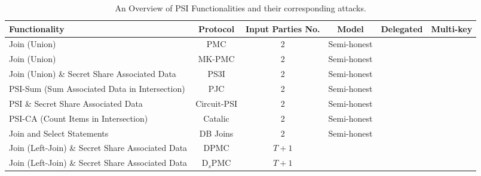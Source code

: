 \begin{table*}[h!]
\centering
\renewcommand{\arraystretch}{1.1}
\begin{tabular}{l c c c c c}
\toprule
\textbf{Functionality} & \textbf{Protocol} & \textbf{Input Parties No.} & \textbf{Model}  & \textbf{Delegated} & \textbf{Multi-key} \\
\midrule
Join (Union) & PMC & 2 & Semi-honest &   &   \\
Join (Union) & MK-PMC & 2 & Semi-honest &   &    \\
Join (Union) \& Secret Share Associated Data & PS3I & 2 & Semi-honest &   &   \\
PSI-Sum (Sum Associated Data in Intersection) & PJC & 2 & Semi-honest  &  &    \\
PSI \& Secret Share Associated Data & Circuit-PSI & 2 & Semi-honest  &  &    \\
PSI-CA (Count Items in Intersection) & Catalic & 2 & Semi-honest &   &   \\
Join and Select Statements & DB Joins & 2 & Semi-honest  &  &    \\
Join (Left-Join) \& Secret Share Associated Data & DPMC & $T + 1$ &   &  &    \\
Join (Left-Join) \& Secret Share Associated Data & D$_s$PMC & $T + 1$ &   &  &    \\
\bottomrule
\end{tabular}
\caption{An Overview of PSI Functionalities and their corresponding attacks.}
\label{tab:protocol_comparison}
\end{table*}
